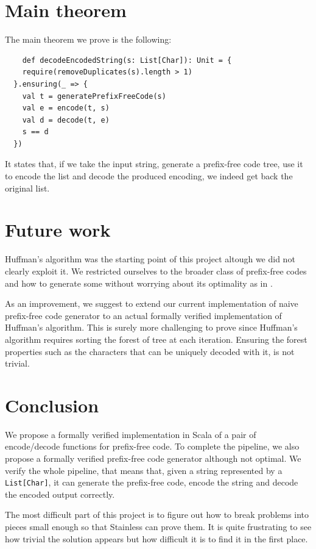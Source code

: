 \documentclass[a4paper,UKenglish,cleveref, autoref, thm-restate]{lipics-v2021}
\begin{document}
\begin{enumerate}
\section{Main theorem}
The main theorem we prove is the following:
\begin{lstlisting}
    def decodeEncodedString(s: List[Char]): Unit = {
    require(removeDuplicates(s).length > 1)
  }.ensuring(_ => {
    val t = generatePrefixFreeCode(s)
    val e = encode(t, s)
    val d = decode(t, e)
    s == d
  })
\end{lstlisting}

It states that, if we take the input string, generate a prefix-free code tree, use it to encode the list and decode the produced encoding, we indeed get back the original list.

\section{Future work}

Huffman's algorithm was the starting point of this project altough we did not clearly exploit it. We restricted ourselves to the broader class of prefix-free codes and how to generate some without worrying about its optimality as in \cite{blanchette}. 

As an improvement, we suggest to extend our current implementation of naive prefix-free code generator to an actual formally verified implementation of Huffman's algorithm. This is surely more challenging to prove since Huffman's algorithm requires sorting the forest of tree at each iteration. Ensuring the forest properties such as the characters that can be uniquely decoded with it, is not trivial.

\section{Conclusion}
We propose a formally verified implementation in Scala of a pair of encode/decode functions for prefix-free code. To complete the pipeline, we also propose a formally verified prefix-free code generator although not optimal.
We verify the whole pipeline, that means that, given a string represented by a \lstinline{List[Char]}, it can generate the prefix-free code, encode the string and decode the encoded output correctly.

The most difficult part of this project is to figure out how to break problems into pieces small enough so that Stainless can prove them. 
It is quite frustrating to see how trivial the solution appears but how difficult it is to find it in the first place.



\end{enumerate}
\end{document}
